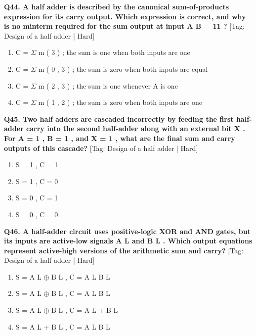 \noindent\textbf{Q44. A half adder is described by the canonical sum-of-products expression for its carry output. Which expression is correct, and why is no minterm required for the sum output at input A B = 11 ?} \hfill [Tag: Design of a half adder | Hard]
\begin{enumerate}[label=(\alph*),topsep=2pt,itemsep=1pt,partopsep=0pt,parsep=0pt]
    \item {C = $\Sigma$ m ( 3 ) ; the sum is one when both inputs are one}
    \item {C = $\Sigma$ m ( 0 , 3 ) ; the sum is zero when both inputs are equal}
    \item {C = $\Sigma$ m ( 2 , 3 ) ; the sum is one whenever A is one}
    \item {C = $\Sigma$ m ( 1 , 2 ) ; the sum is zero when both inputs are one}
\end{enumerate}
\vspace{2mm}

\noindent\textbf{Q45. Two half adders are cascaded incorrectly by feeding the first half-adder carry into the second half-adder along with an external bit X . For A = 1 , B = 1 , and X = 1 , what are the final sum and carry outputs of this cascade?} \hfill [Tag: Design of a half adder | Hard]
\begin{enumerate}[label=(\alph*),topsep=2pt,itemsep=1pt,partopsep=0pt,parsep=0pt]
    \item {S = 1 , C = 1}
    \item {S = 1 , C = 0}
    \item {S = 0 , C = 1}
    \item {S = 0 , C = 0}
\end{enumerate}
\vspace{2mm}

\noindent\textbf{Q46. A half-adder circuit uses positive-logic XOR and AND gates, but its inputs are active-low signals A L and B L . Which output equations represent active-high versions of the arithmetic sum and carry?} \hfill [Tag: Design of a half adder | Hard]
\begin{enumerate}[label=(\alph*),topsep=2pt,itemsep=1pt,partopsep=0pt,parsep=0pt]
    \item {S = A L $\oplus$ B L , C = A L B L}
    \item {S = A L $\oplus$ B L , C = A L B L}
    \item {S = A L $\oplus$ B L , C = A L + B L}
    \item {S = A L + B L , C = A L B L}
\end{enumerate}
\vspace{2mm}

